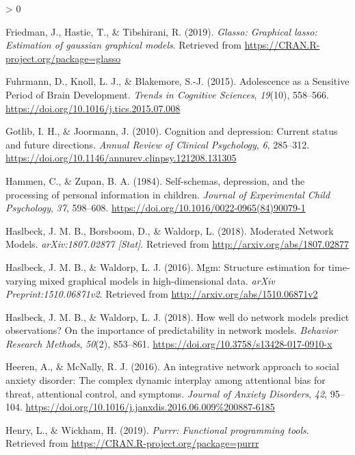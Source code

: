 \documentclass[
  english,
  man]{apa6}
\newlength{\cslhangindent}
\newenvironment{CSLReferences}[2] %
 {%
  \setlength{\parindent}{0pt}
  \ifodd #1 \everypar{\setlength{\hangindent}{\cslhangindent}}\ignorespaces\fi
  \ifnum #2 > 0
  \setlength{\parskip}{#2\baselineskip}
  \fi
 }%
 {}
\begin{document}
\begin{CSLReferences}{1}{0}
\leavevmode\hypertarget{ref-R-glasso}{}%
Friedman, J., Hastie, T., \& Tibshirani, R. (2019). \emph{Glasso: Graphical lasso: Estimation of gaussian graphical models}. Retrieved from \url{https://CRAN.R-project.org/package=glasso}

\leavevmode\hypertarget{ref-fuhrmann_adolescence_2015}{}%
Fuhrmann, D., Knoll, L. J., \& Blakemore, S.-J. (2015). Adolescence as a {Sensitive} {Period} of {Brain} {Development}. \emph{Trends in Cognitive Sciences}, \emph{19}(10), 558--566. \url{https://doi.org/10.1016/j.tics.2015.07.008}

\leavevmode\hypertarget{ref-Gotlib2010}{}%
Gotlib, I. H., \& Joormann, J. (2010). Cognition and depression: Current status and future directions. \emph{Annual Review of Clinical Psychology}, \emph{6}, 285--312. \url{https://doi.org/10.1146/annurev.clinpsy.121208.131305}

\leavevmode\hypertarget{ref-Hammen1984}{}%
Hammen, C., \& Zupan, B. A. (1984). Self-schemas, depression, and the processing of personal information in children. \emph{Journal of Experimental Child Psychology}, \emph{37}, 598--608. \url{https://doi.org/10.1016/0022-0965(84)90079-1}

\leavevmode\hypertarget{ref-haslbeck_moderated_2018}{}%
Haslbeck, J. M. B., Borsboom, D., \& Waldorp, L. (2018). Moderated {Network} {Models}. \emph{arXiv:1807.02877 {[}Stat{]}}. Retrieved from \url{http://arxiv.org/abs/1807.02877}

\leavevmode\hypertarget{ref-R-mgm}{}%
Haslbeck, J. M. B., \& Waldorp, L. J. (2016). Mgm: Structure estimation for time-varying mixed graphical models in high-dimensional data. \emph{arXiv Preprint:1510.06871v2}. Retrieved from \url{http://arxiv.org/abs/1510.06871v2}

\leavevmode\hypertarget{ref-haslbeck_how_2018}{}%
Haslbeck, J. M. B., \& Waldorp, L. J. (2018). How well do network models predict observations? {On} the importance of predictability in network models. \emph{Behavior Research Methods}, \emph{50}(2), 853--861. \url{https://doi.org/10.3758/s13428-017-0910-x}

\leavevmode\hypertarget{ref-heeren_integrative_2016}{}%
Heeren, A., \& McNally, R. J. (2016). An integrative network approach to social anxiety disorder: {The} complex dynamic interplay among attentional bias for threat, attentional control, and symptoms. \emph{Journal of Anxiety Disorders}, \emph{42}, 95--104. \url{https://doi.org/10.1016/j.janxdis.2016.06.009\%200887-6185}

\leavevmode\hypertarget{ref-R-purrr}{}%
Henry, L., \& Wickham, H. (2019). \emph{Purrr: Functional programming tools}. Retrieved from \url{https://CRAN.R-project.org/package=purrr}


\end{CSLReferences}
\end{document}

